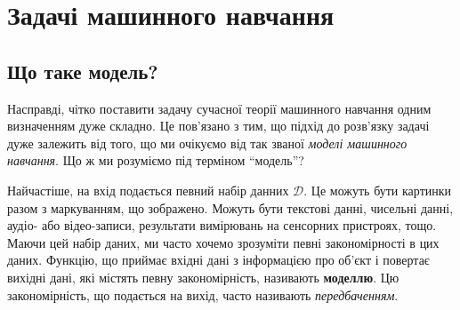 \usetikzlibrary{positioning, arrows.meta}

\chapter{Задачі машинного навчання}

\section{Що таке модель?}

Насправді, чітко поставити задачу сучасної теорії машинного навчання одним
визначенням дуже складно. Це пов'язано з тим, що підхід до розв'язку задачі дуже
залежить від того, що ми очікуємо від так званої \textit{моделі машинного
навчання}. Що ж ми розуміємо під терміном ``модель''?

Найчастіше, на вхід подається певний набір данних $\mathcal{D}$. Це можуть бути
картинки разом з маркуванням, що зображено. Можуть бути текстові данні, чисельні
данні, аудіо- або відео-записи, результати вимірювань на сенсорних пристроях,
тощо. Маючи цей набір даних, ми часто хочемо зрозуміти певні закономірності в
цих даних. Функцію, що приймає вхідні дані з інформацією про об'єкт і повертає
вихідні дані, які містять певну закономірність, називають \textbf{моделлю}. Цю
закономірність, що подається на вихід, часто називають \textit{передбаченням}.

